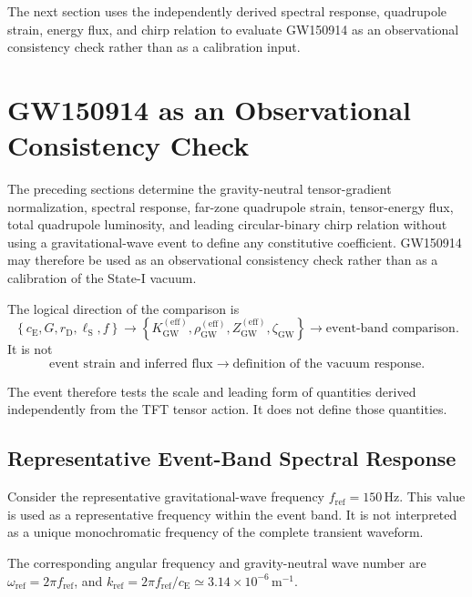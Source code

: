 The next section uses the independently derived spectral response, quadrupole strain, energy flux, and chirp relation to evaluate GW150914 as an observational consistency check rather than as a calibration input.

\section{GW150914 as an Observational Consistency Check}
\label{sec:n11_gw150914_consistency}

The preceding sections determine the gravity-neutral tensor-gradient normalization, spectral response, far-zone quadrupole strain, tensor-energy flux, total quadrupole luminosity, and leading circular-binary chirp relation without using a gravitational-wave event to define any constitutive coefficient. GW150914 may therefore be used as an observational consistency check rather than as a calibration of the State-I vacuum.

The logical direction of the comparison is
\begin{equation}
    \left\{ c_{\mathrm{E}}, G, r_{\mathrm{D}}, \ell_{\mathrm{S}}, f \right\} \longrightarrow \left\{ K_{\mathrm{GW}}^{(\mathrm{eff})}, \rho_{\mathrm{GW}}^{(\mathrm{eff})}, Z_{\mathrm{GW}}^{(\mathrm{eff})}, \zeta_{\mathrm{GW}} \right\} \longrightarrow \text{event-band comparison}.
    \label{eq:n11_logical_direction}
\end{equation}
It is not
\begin{equation}
    \text{event strain and inferred flux} \longrightarrow \text{definition of the vacuum response}.
\end{equation}

The event therefore tests the scale and leading form of quantities derived independently from the TFT tensor action. It does not define those quantities.

\subsection{Representative Event-Band Spectral Response}
\label{subsec:n11_event_band_response}

Consider the representative gravitational-wave frequency $f_{\mathrm{ref}} = 150\,\mathrm{Hz}$. This value is used as a representative frequency within the event band. It is not interpreted as a unique monochromatic frequency of the complete transient waveform.

The corresponding angular frequency and gravity-neutral wave number are $\omega_{\mathrm{ref}} = 2\pi f_{\mathrm{ref}}$, and $k_{\mathrm{ref}} = 2\pi f_{\mathrm{ref}} / c_{\mathrm{E}} \simeq 3.14\times10^{-6}\,\mathrm{m^{-1}}$.

